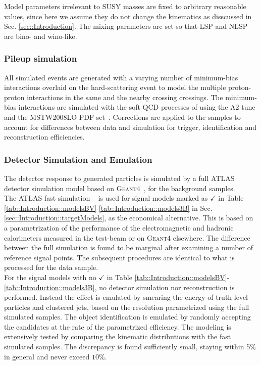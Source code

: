 Model parameters irrelevant to SUSY masses are fixed to arbitrary reasonable values, 
since here we assume they do not change the kinematics as disscussed in Sec. \ref{sec::Introduction}.
The mixing parameters are set so that LSP and NLSP are bino- and wino-like. \\



\subsubsection{Pileup simulation}
All simulated events are generated with a varying number of minimum-bias interactions overlaid on the hard-scattering event to model the multiple proton-proton interactions in the same and the nearby crossing crossings.
The minimum-bias interactions are simulated with the soft QCD processes of  using the A2 tune \cite{ATLAS:2012uec} and the MSTW2008LO PDF set~\cite{MSTW}. 
Corrections are applied to the samples to account for differences between data and simulation for trigger, identification and reconstruction efficiencies. \\



\subsubsection{Detector Simulation and Emulation}
The detector response to generated particles is simulated by a full ATLAS detector simulation model \cite{ATLASFullSimu:2010wqa} based on \textsc{Geant4}~\cite{Agostinelli:2002hh}, for the background samples. \\

The ATLAS fast simulation ~\cite{atlfast} is used for signal models marked as $\checkmark$ in Table \ref{tab::Introduction::modelsBV}-\ref{tab::Introduction::models3B} in Sec. \ref{sec::Introduction::targetModels}, as the economical alternative. This is based on a parametrization of the performance of the electromagnetic and hadronic calorimeters measured in the test-beam or on \textsc{Geant4} elsewhere. The difference between the full simulation is found to be marginal after examining a number of reference signal points.
The subsequent procedures are identical to what is processed for the data sample. \\

For the signal models with no $\checkmark$ in Table \ref{tab::Introduction::modelsBV}-\ref{tab::Introduction::models3B}, no detector simulation nor reconstruction is performed. Instead the effect is emulated by smearing the energy of truth-level particles and clustered jets, based on the resolution parametrized using the full simulated samples. The object identification is emulated by randomly accepting the candidates at the rate of the parametrized efficiency. The modeling is extensively tested by comparing the kinematic distributions with the fast simulated samples. The discrepancy is found sufficiently small, staying within 5$\%$ in general and never exceed $10\%$. \\

